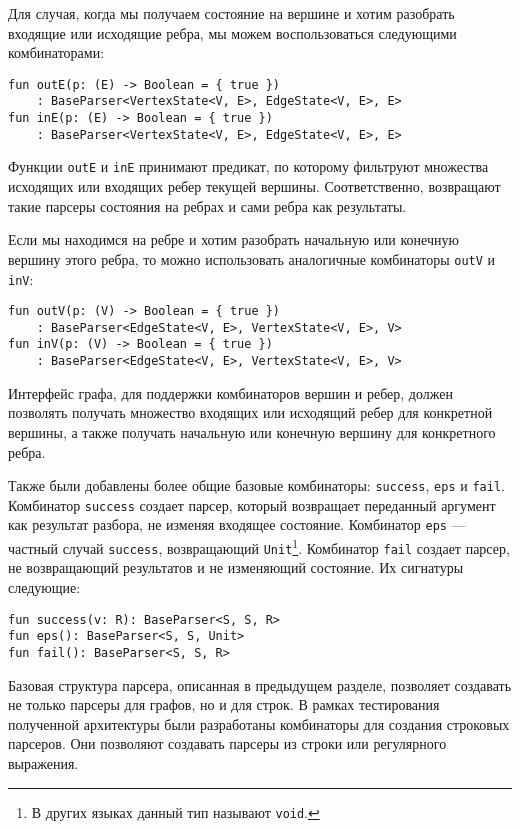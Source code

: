 Для случая, когда мы получаем состояние на вершине и хотим разобрать входящие или исходящие ребра, мы можем воспользоваться следующими комбинаторами:

\begin{nobreaks}
\begin{lstlisting}
fun outE(p: (E) -> Boolean = { true })
    : BaseParser<VertexState<V, E>, EdgeState<V, E>, E>
fun inE(p: (E) -> Boolean = { true })
    : BaseParser<VertexState<V, E>, EdgeState<V, E>, E>
\end{lstlisting}
\end{nobreaks}

Функции \verb|outE| и \verb|inE| принимают предикат, по которому фильтруют множества исходящих или входящих ребер текущей вершины. Соответственно, возвращают такие парсеры состояния на ребрах и сами ребра как результаты.

Если мы находимся на ребре и хотим разобрать начальную или конечную вершину этого ребра, то можно использовать аналогичные комбинаторы \verb|outV| и \verb|inV|:
\begin{lstlisting}
fun outV(p: (V) -> Boolean = { true })
    : BaseParser<EdgeState<V, E>, VertexState<V, E>, V>
fun inV(p: (V) -> Boolean = { true })
    : BaseParser<EdgeState<V, E>, VertexState<V, E>, V>
\end{lstlisting}

Интерфейс графа, для поддержки комбинаторов вершин и ребер, должен позволять получать множество входящих или исходящий ребер для конкретной вершины, а также получать начальную или конечную вершину для конкретного ребра.

Также были добавлены более общие базовые комбинаторы: \verb|success|, \verb|eps| и \verb|fail|.
Комбинатор \verb|success| создает парсер, который возвращает переданный аргумент как результат разбора, не изменяя входящее состояние.
Комбинатор \verb|eps| --- частный случай \verb|success|, возвращающий \verb|Unit|\footnote{В других языках данный тип называют \texttt{void}.}.
Комбинатор \verb|fail| создает парсер, не возвращающий результатов и не изменяющий состояние.
Их сигнатуры следующие:
\begin{lstlisting}
fun success(v: R): BaseParser<S, S, R>  
fun eps(): BaseParser<S, S, Unit>
fun fail(): BaseParser<S, S, R>
\end{lstlisting}

Базовая структура парсера, описанная в предыдущем разделе, позволяет создавать не только парсеры для графов, но и для строк.
В рамках тестирования полученной архитектуры были разработаны комбинаторы для создания строковых парсеров.
Они позволяют создавать парсеры из строки или регулярного выражения.

